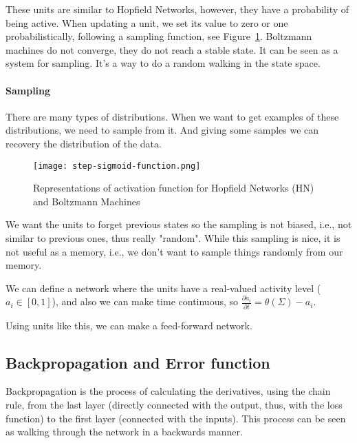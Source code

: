 \documentclass[main]{subfiles}
\begin{document}
These units are similar to Hopfield Networks, however, they have a probability of being active.
When updating a unit, we set its value to zero or one probabilistically, following a sampling function, see Figure~\ref{fig:step-sigmoid-function}.
Boltzmann machines do not converge, they do not reach a stable state.
It can be seen as a system for sampling. It's a way to do a random walking in the state space.

\paragraph{Sampling}
There are many types of distributions.
When we want to get examples of these distributions, we need to sample from it.
And giving some samples we can recovery the distribution of the data.

\begin{figure}[H]
	\centering
	\texttt{[image: step-sigmoid-function.png]}
	\caption{Representations of activation function for Hopfield Networks (HN) and Boltzmann Machines}
	\label{fig:step-sigmoid-function}
\end{figure}

We want the units to forget previous states so the sampling is not biased, i.e., not similar to previous ones, thus really "random".
While this sampling is nice, it is not useful as a memory, i.e., we don't want to sample things randomly from our memory.

We can define a network where the units have a real-valued activity level ($a_i \in [0,1]$), and also we can make time continuous, so $\frac{\partial a_i}{\partial t} = \theta(\Sigma)-a_i$.

Using units like this, we can make a feed-forward network.

\subsection{Backpropagation and Error function}
Backpropagation is the process of calculating the derivatives, using the chain rule, from the last layer (directly connected with the output, thus, with the loss function) to the first layer (connected with the inputs).
This process can be seen as walking through the network in a backwards manner.
\end{document}
